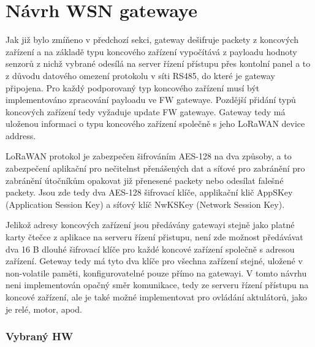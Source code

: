\section{Návrh WSN gatewaye}
Jak již bylo zmíňeno v předchozí sekci, gateway dešifruje packety z koncových zařízení a na základě typu koncového zařízení vypočítává z payloadu hodnoty senzorů z nichž vybrané odesílá na server řízení přístupu přes kontolní panel a to z důvodu datového omezení protokolu v síti RS485, do které je gateway připojena.
Pro každý podporovaný typ koncového zařízení musí být implementováno zpracování payloadu ve FW gatewaye. Pozdější přidání typů koncových zařízení tedy vyžaduje update FW gatewaye.
Gateway tedy má uloženou informaci o typu koncového zařízení společně s jeho LoRaWAN device address.

LoRaWAN protokol je zabezpečen šifrováním AES-128 na dva způsoby, a to zabezpečení aplikační pro nečitelnst přenášených dat a síťové pro zabránění pro zabránění útočníkům opakovat již přenesené packety nebo odesílat falešné packety. Jsou zde tedy dva AES-128 šifrovací klíče, applikační klič AppSKey (Application Session Key) a síťový klíč NwKSKey (Network Session Key).

Jelikož adresy koncových zařízení jsou předávány gatewayi stejně jako platné karty čtečce z aplikace na serveru řízení přistupu, není zde možnost předávávat dva 16 B dlouhé šifrovací klíče pro každé koncové zařízení společně s adresou zařízení. Geteway tedy má tyto dva klíče pro všechna zařízení stejné, uložené v non-volatile paměti, konfigurovatelné pouze přímo na gatewayi.
V tomto návrhu neni implementován opačný směr komunikace, tedy ze serveru řízení přístupu na koncové zařízení, ale je také možné implementovat pro ovládání aktulátorů, jako je relé, motor, apod.

\subsubsection{Vybraný HW}


